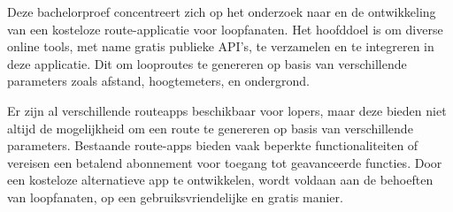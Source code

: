 
%
%
%
%
%

%



Deze bachelorproef concentreert zich op het onderzoek naar en de ontwikkeling van een kosteloze route-applicatie voor loopfanaten. 
Het hoofddoel is om diverse online tools, met name gratis publieke API's, te verzamelen en te integreren in deze applicatie. 
Dit om looproutes te genereren op basis van verschillende parameters zoals afstand, hoogtemeters, en ondergrond.

Er zijn al verschillende routeapps beschikbaar voor lopers, maar deze bieden niet altijd de mogelijkheid om een route te genereren op basis van verschillende parameters. 
Bestaande route-apps bieden vaak beperkte functionaliteiten of vereisen een betalend abonnement voor toegang tot geavanceerde functies. 
Door een kosteloze alternatieve app te ontwikkelen, wordt voldaan aan de behoeften van loopfanaten, op een gebruiksvriendelijke en gratis manier.

